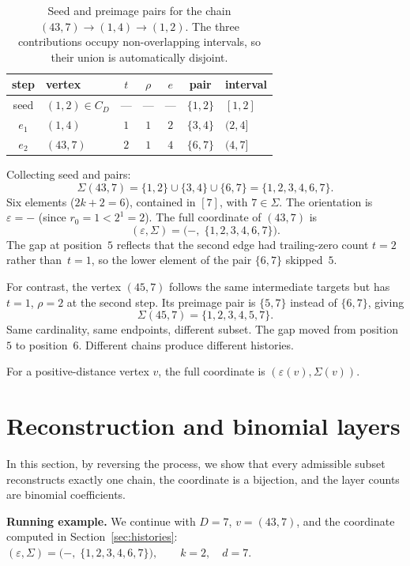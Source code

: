 \documentclass[11pt]{amsart}
\theoremstyle{definition}
\theoremstyle{remark}
\newcommand{\eps}{\varepsilon}
\begin{document}
\begin{table}[htbp]
\centering
\renewcommand{\arraystretch}{1.15}
\begin{tabular}{clccccl}
\toprule
step & vertex & $t$ & $\rho$ & $e$ & pair & interval\\
\midrule
seed & $(1,2)\in C_D$ & --- & --- & --- & $\{1,2\}$ & $[1,2]$\\
$e_1$ & $(1,4)$ & $1$ & $1$ & $2$ & $\{3,4\}$ & $(2,4]$\\
$e_2$ & $(43,7)$ & $2$ & $1$ & $4$ & $\{6,7\}$ & $(4,7]$\\
\bottomrule
\end{tabular}
\smallskip
\caption{Seed and preimage pairs for the chain
  $(43,7)\to(1,4)\to(1,2)$.  The three contributions occupy
  non-overlapping intervals, so their union is automatically disjoint.}
\label{tab:history-ex}
\end{table}

Collecting seed and pairs:
\[
\Sigma(43,7)=\{1,2\}\cup\{3,4\}\cup\{6,7\}=\{1,2,3,4,6,7\}.
\]
Six elements ($2k+2=6$), contained in $[7]$, with $7\in\Sigma$.
The orientation is $\eps=-$ (since $r_0=1<2^1=2$).  The full
coordinate of $(43,7)$ is
\[
  (\eps,\Sigma)=\bigl(-,\;\{1,2,3,4,6,7\}\bigr).
\]
The gap at position~$5$ reflects that the second edge had trailing-zero 
count $t=2$ rather than~$t=1$, so the lower element of the pair $\{6,7\}$ skipped~$5$.

For contrast, the vertex $(45,7)$ follows the same intermediate
targets but has $t=1$, $\rho=2$ at the second step.  Its preimage
pair is $\{5,7\}$ instead of $\{6,7\}$, giving
\[
\Sigma(45,7)=\{1,2,3,4,5,7\}.
\]
Same cardinality, same endpoints, different subset.  The gap moved
from position~$5$ to position~$6$.  Different chains produce
different histories.

\begin{keybox}
For a positive-distance vertex \(v\), the full coordinate is
\(
(\eps(v),\Sigma(v)).
\)
\end{keybox}

\section{Reconstruction and binomial layers}\label{sec:bijection}
In this section, by reversing the process, we show that every admissible subset
reconstructs exactly one chain, the coordinate is a bijection, and the
layer counts are binomial coefficients.

\begin{examplebox}
\textbf{Running example.}
We continue with $D=7$, $v=(43,7)$, and the coordinate computed in
Section~\ref{sec:histories}:
\(
  (\eps,\Sigma)=\bigl(-,\;\{1,2,3,4,6,7\}\bigr),\qquad k=2,\quad d=7.
\)
\end{examplebox}
\end{document}
